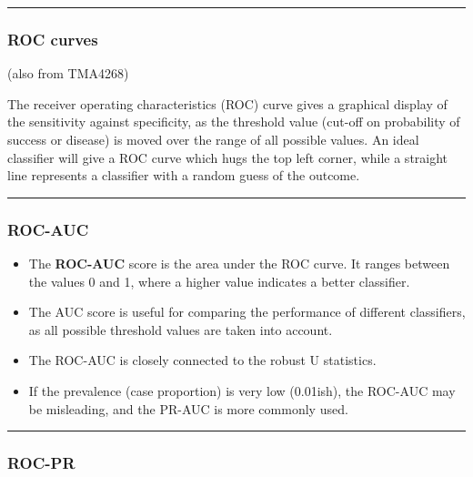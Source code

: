 \documentclass[
  letterpaper,
  DIV=11,
  numbers=noendperiod]{scrartcl}
\providecommand{\tightlist}{%
  \setlength{\itemsep}{0pt}\setlength{\parskip}{0pt}}\usepackage{longtable,booktabs,array}
\begin{document}
\begin{center}\rule{0.5\linewidth}{0.5pt}\end{center}

\hypertarget{roc-curves}{%
\subsubsection{ROC curves}\label{roc-curves}}

(also from TMA4268)

The receiver operating characteristics (ROC) curve gives a graphical
display of the sensitivity against specificity, as the threshold value
(cut-off on probability of success or disease) is moved over the range
of all possible values. An ideal classifier will give a ROC curve which
hugs the top left corner, while a straight line represents a classifier
with a random guess of the outcome.

\begin{center}\rule{0.5\linewidth}{0.5pt}\end{center}

\hypertarget{roc-auc}{%
\subsubsection{ROC-AUC}\label{roc-auc}}

\begin{itemize}
\tightlist
\item
  The \textbf{ROC-AUC} score is the area under the ROC curve. It ranges
  between the values 0 and 1, where a higher value indicates a better
  classifier.
\item
  The AUC score is useful for comparing the performance of different
  classifiers, as all possible threshold values are taken into account.
\item
  The ROC-AUC is closely connected to the robust U statistics.
\item
  If the prevalence (case proportion) is very low (0.01ish), the ROC-AUC
  may be misleading, and the PR-AUC is more commonly used.
\end{itemize}

\begin{center}\rule{0.5\linewidth}{0.5pt}\end{center}

\hypertarget{roc-pr}{%
\subsubsection{ROC-PR}\label{roc-pr}}
\end{document}

